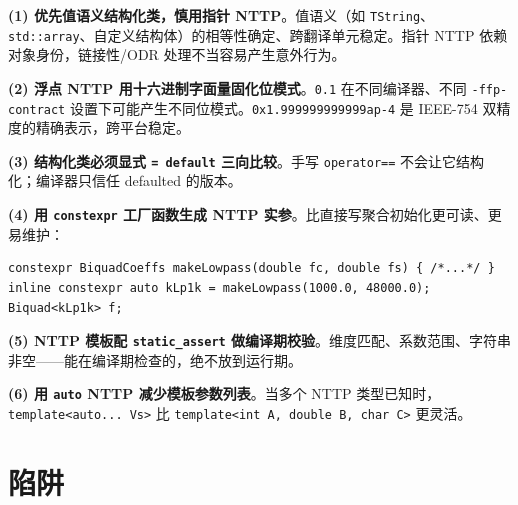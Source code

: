\documentclass[12pt,a4paper,fontset=fandol]{ctexbook}
\newcommand{\kw}[1]{\texttt{#1}}
\begin{document}
\begin{bestpractice}
\textbf{(1) 优先值语义结构化类，慎用指针 NTTP}。值语义（如 \kw{TString}、\kw{std::array}、自定义结构体）的相等性确定、跨翻译单元稳定。指针 NTTP 依赖对象身份，链接性/ODR 处理不当容易产生意外行为。

\textbf{(2) 浮点 NTTP 用十六进制字面量固化位模式}。\kw{0.1} 在不同编译器、不同 \kw{-ffp-contract} 设置下可能产生不同位模式。\kw{0x1.999999999999ap-4} 是 IEEE-754 双精度的精确表示，跨平台稳定。

\textbf{(3) 结构化类必须显式 \kw{= default} 三向比较}。手写 \kw{operator==} 不会让它结构化；编译器只信任 defaulted 的版本。

\textbf{(4) 用 \kw{constexpr} 工厂函数生成 NTTP 实参}。比直接写聚合初始化更可读、更易维护：

\begin{lstlisting}
constexpr BiquadCoeffs makeLowpass(double fc, double fs) { /*...*/ }
inline constexpr auto kLp1k = makeLowpass(1000.0, 48000.0);
Biquad<kLp1k> f;
\end{lstlisting}

\textbf{(5) NTTP 模板配 \kw{static\_assert} 做编译期校验}。维度匹配、系数范围、字符串非空——能在编译期检查的，绝不放到运行期。

\textbf{(6) 用 \kw{auto} NTTP 减少模板参数列表}。当多个 NTTP 类型已知时，\kw{template<auto... Vs>} 比 \kw{template<int A, double B, char C>} 更灵活。
\end{bestpractice}

\section{陷阱}
\end{document}
